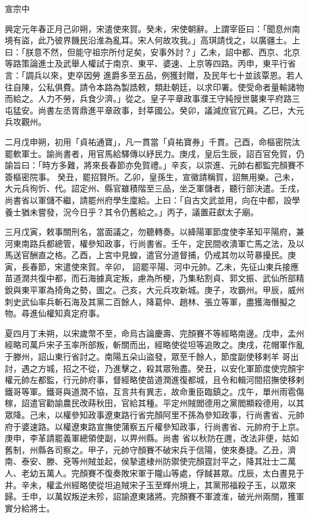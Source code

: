 
\begin{pinyinscope}

 宣宗中



 興定元年春正月己卯朔，宋遣使來賀。癸未，宋使朝辭。上謂宰臣曰：「聞息州南境有盜，此乃彼界饑民沿淮為亂耳。宋人何故攻我。」高琪請伐之，以廣疆土。上曰：「朕意不然，但能守祖宗所付足矣，安事外討？」乙未，詔中都、西京、北京等路策論進士及武舉人權試于南京、東平、婆速、上京等四路。丙申，東平行省言：「調兵以來，吏卒因勞
 進爵多至五品，例獲封贈，及民年七十並該覃恩。若人往自陳，公私俱費。請令本路為製誥敕，類赴朝廷，以求印署。使受命者量輸諸物而給之。人力不勞，兵食少濟。」從之。皇子平章政事濮王守純授世襲東平府路三屯猛安。尚書左丞胥鼎進平章政事，封莘國公。癸卯，議減庶官冗員。乙巳，大元兵攻觀州。



 二月戊申朔，初用「貞祐通寶」，凡一貫當「貞祐寶券」千貫。己酉，命樞密院汰罷軟軍士。諭尚書者，用官馬給驛傳以紓民力。庚戌，皇后生辰，詔百官免賀，仍諭旨曰：「時方多難，將來長春節亦免賀禮。」辛亥，以崇進、元帥右都監完顏賽不簽樞密院事。
 癸丑，罷招賢所。乙卯，皇孫生，宣徽請稱賀，詔無用樂。己未，大元兵徇忻、代。詔定州、縣官雖積階至三品，坐乏軍儲者，聽行部決遣。壬戌，尚書省以軍儲不繼，請罷州府學生廩給。上曰：「自古文武並用，向在中都，設學養士猶未嘗發，況今日乎？其令仍舊給之。」丙子，議置莊獻太子廟。



 三月戊寅，敕事關刑名，當面議之，勿聽轉奏。以絳陽軍節度使李革知平陽府，兼河東南路兵都總管，權參知政事，行尚書省。壬午，定民間收潰軍亡馬之法，及以馬送官酬直之格。乙酉，上宮中見蝗，遣官分道督捕，仍戒其勿以苛暴擾民。庚寅，長春節，宋遣使來賀。辛卯，
 詔罷平陽、河中元帥。乙未，先征山東兵接應苗道潤共復中都，而石海據真定叛，慮為所梗，乃集粘割貞、郭文振、武仙所部精銳與東平軍為掎角之勢，圖之。己亥，大元兵攻新城。庚子，攻霸州。甲辰，威州刺史武仙率兵斬石海及其黨二百餘人，降葛仲、趙林、張立等軍，盡獲海僭擬之物。尋進仙權知真定府事。



 夏四月丁未朔，以宋歲幣不至，命烏古論慶壽、完顏賽不等經略南邊。戊申，孟州經略司萬戶宋子玉率所部叛，斬關而出，經略使從坦等追敗之。庚戌，花帽軍作亂于滕州，詔山東行省討之。南陽五朵山盜發，眾至千餘人，節度副使移剌羊
 哥出討，遇之方城，招之不從，乃進擊之，殺其眾殆盡。癸丑，以安化軍節度使完顏宇權元帥左都監，行元帥府事，督經略使苗道潤進復都城，且令和輯河間招撫使移剌鐵哥等軍。鐵哥與道潤不協，互言共有異志，故命重臣臨鎮之。戊午，單州雨雹傷稼，詔遣官勸諭農民改蒔秋田，官給其種。平定州賊閻德用之黨閻顯殺德用，以其眾降。己未，以權參知政事遼東路行省完顏阿里不孫為參知政事，行尚書省、元帥府于婆速路。以權遼東路宣撫使蒲察五斤權參知政事，行尚書省、元帥府于上京。庚申，李革請罷義軍總領使副，以畀州縣。尚書
 省以秋防在邇，改法非便，姑如舊制，州縣各司察之。甲子，元帥守顏賽不破宋兵于信陽，使來奏捷。乙丑，濟南、泰安、滕、兗等州賊並起，侯摯遣棣州防禦使完顏霆討平之，降其壯士二萬人、老幼五萬人。完顏賽不復奏敗宋軍于隴山等處，俘馘甚眾。戊辰，太白晝見于井。辛未，權孟州經略使從坦追賊宋子玉至輝州境上，其黨邢福殺子玉，以眾來歸。壬申，以萬奴叛逆未殄，詔諭遼東諸將。完顏賽不軍渡淮，破光州兩關，獲軍實分給將士。




\end{pinyinscope}
